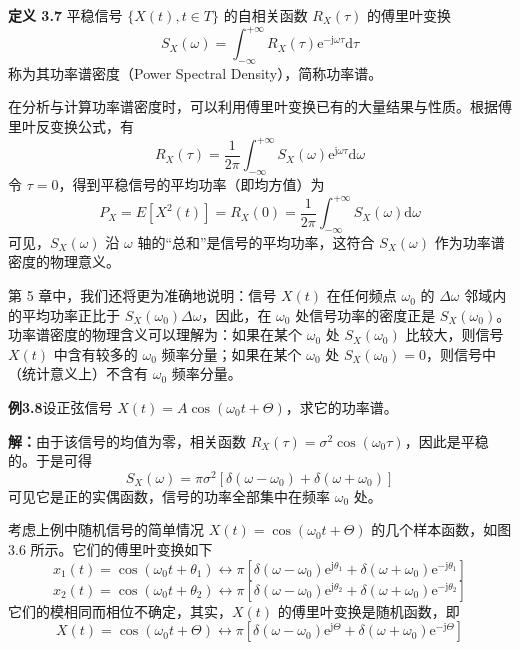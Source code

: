 \documentclass[11pt,openany,UTF8]{ctexbook}
\newcommand{\dif}{\mathrm{d}}                      %
\newcommand{\eu}{\mathrm{e}}                       %
\newcommand{\ju}{\mathrm{j}}                       %
\newcommand{\E}{E}                                 %
\newcommand{\thm}[1]{\par\medskip\noindent\textbf{#1}\quad}
\newcommand{\fw}[1]{{\xeCJKsetup{CJKecglue={}}（#1\nobreak）}}
\begin{document}
\thm{定义 3.7} 平稳信号 $\{X(t),t\in T\}$ 的自相关函数 $R_X(\tau)$ 的傅里叶变换
\begin{equation}
S_X(\omega)=\int_{-\infty}^{+\infty}R_X(\tau)\eu^{-\ju\omega\tau}\dif\tau
\label{eq:3.17}
\end{equation}
称为其功率谱密度\fw{Power Spectral Density}\nobreak，简称功率谱\nobreak。

在分析与计算功率谱密度时\nobreak，可以利用傅里叶变换已有的大量结果与性质\nobreak。根据傅里叶反变换公式\nobreak，有
\begin{equation}
R_X(\tau)=\frac{1}{2\pi}\int_{-\infty}^{+\infty}S_X(\omega)\eu^{\ju\omega\tau}\dif\omega
\label{eq:3.18}
\end{equation}
令 $\tau=0$\nobreak，得到平稳信号的平均功率（即均方值\nobreak）为
\begin{equation}
P_X=\E\left[X^2(t)\right]=R_X(0)=\frac{1}{2\pi}\int_{-\infty}^{+\infty}S_X(\omega)\dif\omega
\label{eq:3.19}
\end{equation}
可见\nobreak，$S_X(\omega)$ 沿 $\omega$ 轴的“总和”是信号的平均功率\nobreak，这符合 $S_X(\omega)$ 作为功率谱密度的物理意义\nobreak。

第 5 章中\nobreak，我们还将更为准确地说明\nobreak：信号 $X(t)$ 在任何频点 $\omega_0$ 的 $\Delta\omega$ 邻域内的平均功率正比于 $S_X(\omega_0)\Delta\omega$\nobreak，因此\nobreak，在 $\omega_0$ 处信号功率的密度正是 $S_X(\omega_0)$\nobreak。功率谱密度的物理含义可以理解为\nobreak：如果在某个 $\omega_0$ 处 $S_X(\omega_0)$ 比较大\nobreak，则信号 $X(t)$ 中含有较多的 $\omega_0$ 频率分量\nobreak；如果在某个 $\omega_0$ 处 $S_X(\omega_0)=0$\nobreak，则信号中（统计意义上\nobreak）不含有 $\omega_0$ 频率分量\nobreak。

\begin{examplebox}
\textbf{例3.8}\quad 设正弦信号 $X(t)=A\cos(\omega_0t+\Theta)$\nobreak，求它的功率谱\nobreak。

\textbf{解\nobreak：}由于该信号的均值为零\nobreak，相关函数 $R_X(\tau)=\sigma^2\cos(\omega_0\tau)$\nobreak，因此是平稳的\nobreak。于是可得
\[
S_X(\omega)=\pi\sigma^2\left[\delta(\omega-\omega_0)+\delta(\omega+\omega_0)\right]
\]
可见它是正的实偶函数\nobreak，信号的功率全部集中在频率 $\omega_0$ 处\nobreak。
\end{examplebox}

考虑上例中随机信号的简单情况 $X(t)=\cos(\omega_0t+\Theta)$ 的几个样本函数\nobreak，如图 3.6 所示\nobreak。它们的傅里叶变换如下
\[
x_1(t)=\cos(\omega_0t+\theta_1)\longleftrightarrow\pi\left[\delta(\omega-\omega_0)\eu^{\ju\theta_1}+\delta(\omega+\omega_0)\eu^{-\ju\theta_1}\right]
\]
\[
x_2(t)=\cos(\omega_0t+\theta_2)\longleftrightarrow\pi\left[\delta(\omega-\omega_0)\eu^{\ju\theta_2}+\delta(\omega+\omega_0)\eu^{-\ju\theta_2}\right]
\]
它们的模相同而相位不确定\nobreak，其实\nobreak，$X(t)$ 的傅里叶变换是随机函数\nobreak，即
\[
X(t)=\cos(\omega_0t+\Theta)\longleftrightarrow\pi\left[\delta(\omega-\omega_0)\eu^{\ju\Theta}+\delta(\omega+\omega_0)\eu^{-\ju\Theta}\right]
\]
\end{document}
